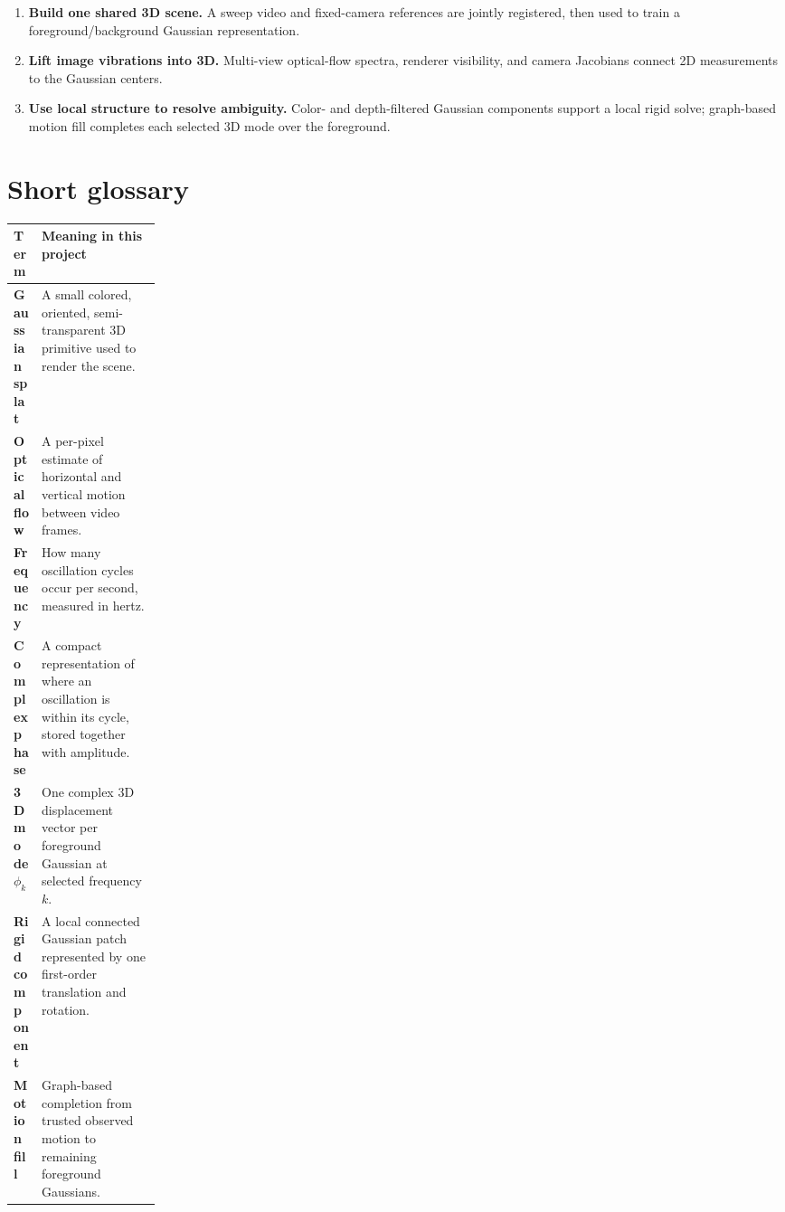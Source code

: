 \documentclass[10pt]{article}
\begin{document}
\begin{enumerate}[leftmargin=1.55em,itemsep=0.35em]
  \item \textbf{Build one shared 3D scene.} A sweep video and fixed-camera
  references are jointly registered, then used to train a foreground/background
  Gaussian representation.
  \item \textbf{Lift image vibrations into 3D.} Multi-view optical-flow
  spectra, renderer visibility, and camera Jacobians connect 2D measurements to
  the Gaussian centers.
  \item \textbf{Use local structure to resolve ambiguity.} Color- and
  depth-filtered Gaussian components support a local rigid solve; graph-based
  motion fill completes each selected 3D mode over the foreground.
\end{enumerate}

\section*{Short glossary}

\begin{tabularx}{\linewidth}{@{}>{\bfseries}p{0.19\linewidth}X@{}}
\toprule
Term & Meaning in this project \\
\midrule
Gaussian splat & A small colored, oriented, semi-transparent 3D primitive used
to render the scene. \\
Optical flow & A per-pixel estimate of horizontal and vertical motion between
video frames. \\
Frequency & How many oscillation cycles occur per second, measured in hertz. \\
Complex phase & A compact representation of where an oscillation is within its
cycle, stored together with amplitude. \\
3D mode $\phi_k$ & One complex 3D displacement vector per foreground Gaussian
at selected frequency $k$. \\
Rigid component & A local connected Gaussian patch represented by one
first-order translation and rotation. \\
Motion fill & Graph-based completion from trusted observed motion to remaining
foreground Gaussians. \\
\bottomrule
\end{tabularx}



\end{document}
